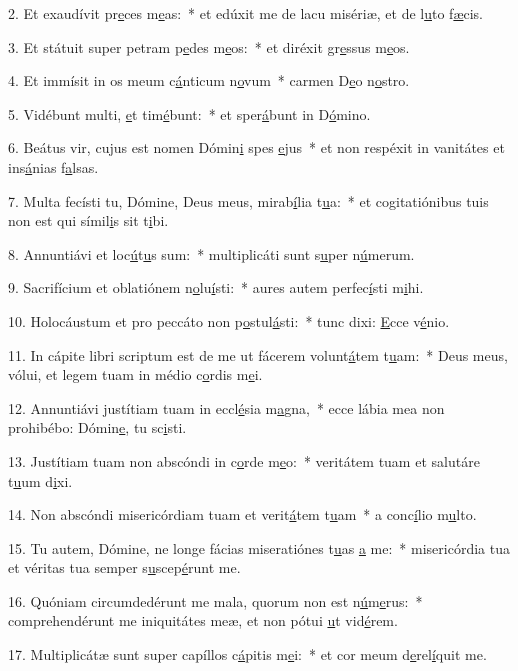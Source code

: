 2. Et exaudívit pr\uline{e}ces m\uline{e}as:~* et edúxit me de lacu misériæ, et de l\uline{u}to f\uline{æ}cis.\par 
3. Et státuit super petram p\uline{e}des m\uline{e}os:~* et diréxit gr\uline{e}ssus m\uline{e}os.\par 
4. Et immísit in os meum c\uline{á}nticum n\uline{o}vum~* carmen D\uline{e}o n\uline{o}stro.\par 
5. Vidébunt multi, \uline{e}t tim\uline{é}bunt:~* et sper\uline{á}bunt in D\uline{ó}mino.\par 
6. Beátus vir, cujus est nomen Dómin\uline{i} spes \uline{e}jus~* et non respéxit in vanitátes et ins\uline{á}nias f\uline{a}lsas.\par 
7. Multa fecísti tu, Dómine, Deus meus, mirab\uline{í}lia t\uline{u}a:~* et cogitatiónibus tuis non est qui símil\uline{i}s sit t\uline{i}bi.\par 
8. Annuntiávi et loc\uline{ú}t\uline{u}s sum:~* multiplicáti sunt s\uline{u}per n\uline{ú}merum.\par 
9. Sacrifícium et oblatiónem n\uline{o}lu\uline{í}sti:~* aures autem perfec\uline{í}sti m\uline{i}hi.\par 
10. Holocáustum et pro peccáto non p\uline{o}stul\uline{á}sti:~* tunc dixi: \uline{E}cce v\uline{é}nio.\par 
11. In cápite libri scriptum est de me ut fácerem volunt\uline{á}tem t\uline{u}am:~* Deus meus, vólui, et legem tuam in médio c\uline{o}rdis m\uline{e}i.\par 
12. Annuntiávi justítiam tuam in eccl\uline{é}sia m\uline{a}gna,~* ecce lábia mea non prohibébo: Dómin\uline{e}, tu sc\uline{i}sti.\par 
13. Justítiam tuam non abscóndi in c\uline{o}rde m\uline{e}o:~* veritátem tuam et salutáre t\uline{u}um d\uline{i}xi.\par 
14. Non abscóndi misericórdiam tuam et verit\uline{á}tem t\uline{u}am~* a conc\uline{í}lio m\uline{u}lto.\par 
15. Tu autem, Dómine, ne longe fácias miseratiónes t\uline{u}as \uline{a} me:~* misericórdia tua et véritas tua semper s\uline{u}scep\uline{é}runt me.\par 
16. Quóniam circumdedérunt me mala, quorum non est n\uline{ú}m\uline{e}rus:~* comprehendérunt me iniquitátes meæ, et non pótui \uline{u}t vid\uline{é}rem.\par 
17. Multiplicátæ sunt super capíllos c\uline{á}pitis m\uline{e}i:~* et cor meum d\uline{e}rel\uline{í}quit me.\par 

